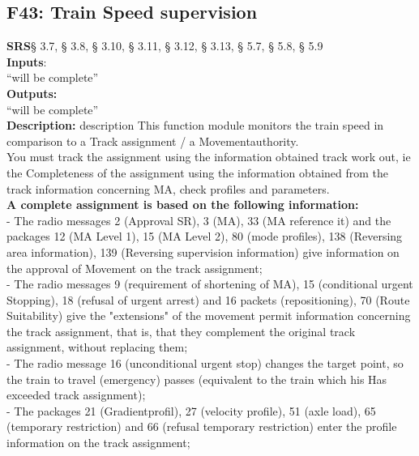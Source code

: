 \documentclass{template/openetcs_report}
\begin{document}
\subsection {F43: Train Speed supervision}
 \textbf{SRS}§ 3.7, § 3.8, § 3.10, § 3.11, § 3.12, § 3.13, § 5.7, § 5.8, § 5.9 \\
 
 \textbf{Inputs}:\\
``will be complete''\\
 
 \textbf{Outputs:}\\
 ``will be complete''\\
 
 \textbf{Description:} 
description 
This function module monitors the train speed in comparison to a 
Track assignment / a Movementauthority. \\

You must track the assignment using the information obtained track work out, ie the 
Completeness of the assignment using the information obtained from the track information
concerning MA, check profiles and parameters. \\

\textbf{A complete assignment is based on the following information:} \\

- The radio messages 2 (Approval SR), 3 (​​MA), 33 (MA reference it) and the packages 12 
(MA Level 1), 15 (MA Level 2), 80 (mode profiles), 138 (Reversing area information), 139 
(Reversing supervision information) give information on the approval of 
Movement on the track assignment; \\

- The radio messages 9 (requirement of shortening of MA), 15 (conditional urgent 
Stopping), 18 (refusal of urgent arrest) and 16 packets (repositioning), 
70 (Route Suitability) give the "extensions" of the movement permit information 
concerning the track assignment, that is, that they complement the original track assignment, 
without replacing them; \\

- The radio message 16 (unconditional urgent stop) changes the target point, so 
the train to travel (emergency) passes (equivalent to the train which his 
Has exceeded track assignment); \\

- The packages 21 (Gradientprofil), 27 (velocity profile), 51 (axle load), 65 
(temporary restriction) and 66 (refusal temporary restriction) 
enter the profile information on the track assignment; \\
\end{document}

